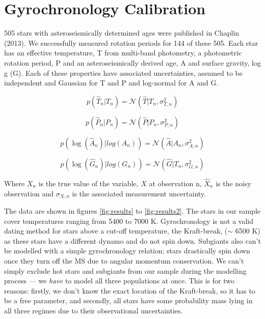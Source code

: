 \documentclass[12pt,preprint]{aastex}
\begin{document}
\section{Gyrochronology Calibration}

505 stars with asteroseismically determined ages were published in Chaplin (2013).
We successfully measured rotation periods for 144 of these 505.
Each star has an effective temperature, T from multi-band photometry, a photometric rotation period, P and an asteroseismically derived age, A and surface gravity, log g (G).
Each of these properties have associated uncertainties, assumed to be independent and Gaussian for T and P and log-normal for A and G.

\begin{equation}
p(\hat{T}_n|T_n) = \mathcal{N}(\hat{T}|T_n, \sigma^2_{T,n})
\end{equation}

\begin{equation}
p(\hat{P}_n|P_n) = \mathcal{N}(\hat{P}|P_n, \sigma^2_{P,n})
\end{equation}

\begin{equation}
p(\log(\hat{A}_n)|log(A_n)) = \mathcal{N}(\hat{A}|A_n, \sigma^2_{A,n})
\end{equation}

\begin{equation}
p(\log(\hat{G}_n)|log(G_n)) = \mathcal{N}(\hat{G}|T_n, \sigma^2_{G,n})
\end{equation}


Where $X_n$ is the true value of the variable, $X$ at observation n, $\hat{X}_n$ is the noisy observation and $\sigma_{X,n}$ is the associated measurement uncertainty.


The data are shown in figures \ref{fig:results} to \ref{fig:results2}.
The stars in our sample cover temperatures ranging from 5400 to 7000 K.
Gyrochronology is not a valid dating method for stars above a cut-off temperature, the Kraft-break, ($\sim$ 6500 K) as these stars have a different dynamo and do not spin down.
Subgiants also can't be modelled with a simple gyrochronology relation; stars drastically spin down once they turn off the MS due to angular momentum conservation.
We can't simply exclude hot stars and subgiants from our sample during the modelling process --- we \emph{have} to model all three populations at once.
This is for two reasons: firstly, we don't know the exact location of the Kraft-break, so it has to be a free parameter,
and secondly, all stars have some probability mass lying in all three regimes due to their observational uncertainties.
\end{document}

